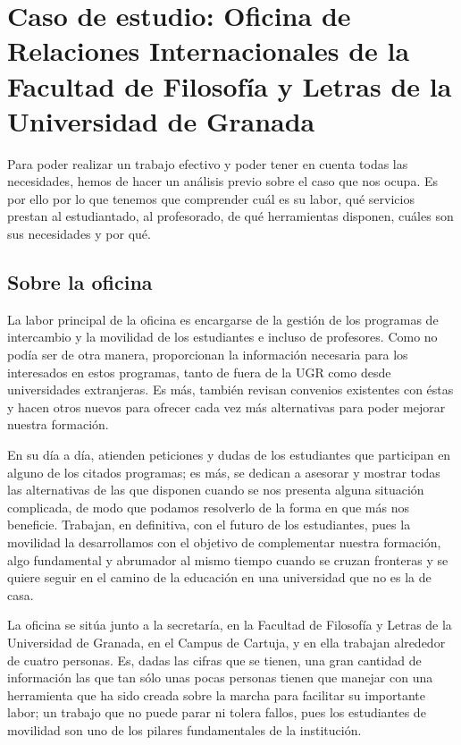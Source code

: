 \chapter{Caso de estudio: Oficina de Relaciones Internacionales de la Facultad de Filosofía y Letras de la Universidad de Granada}

Para poder realizar un trabajo efectivo y poder tener en cuenta todas las necesidades, hemos de hacer un análisis previo sobre el caso que nos ocupa. Es por ello por lo que tenemos que comprender cuál es su labor, qué servicios prestan al estudiantado, al profesorado, de qué herramientas disponen, cuáles son sus necesidades y por qué.

\section{Sobre la oficina}
La labor principal de la oficina es encargarse de la gestión de los programas de intercambio y la movilidad de los estudiantes e incluso de profesores. Como no podía ser de otra manera, proporcionan la información necesaria para los interesados en estos programas, tanto de fuera de la UGR como desde universidades extranjeras. Es más, también revisan convenios existentes con éstas y hacen otros nuevos para ofrecer cada vez más alternativas para poder mejorar nuestra formación.

En su día a día, atienden peticiones y dudas de los estudiantes que participan en alguno de los citados programas; es más, se dedican a asesorar y mostrar todas las alternativas de las que disponen cuando se nos presenta alguna situación complicada, de modo que podamos resolverlo de la forma en que más nos beneficie. Trabajan, en definitiva, con el futuro de los estudiantes, pues la movilidad la desarrollamos con el objetivo de complementar nuestra formación, algo fundamental y abrumador al mismo tiempo cuando se cruzan fronteras y se quiere seguir en el camino de la educación en una universidad que no es la de casa.

La oficina se sitúa junto a la secretaría, en la Facultad de Filosofía y Letras de la Universidad de Granada, en el Campus de Cartuja, y en ella trabajan alrededor de cuatro personas. Es, dadas las cifras que se tienen, una gran cantidad de información las que tan sólo unas pocas personas tienen que manejar con una herramienta que ha sido creada sobre la marcha para facilitar su importante labor; un trabajo que no puede parar ni tolera fallos, pues los estudiantes de movilidad son uno de los pilares fundamentales de la institución.

